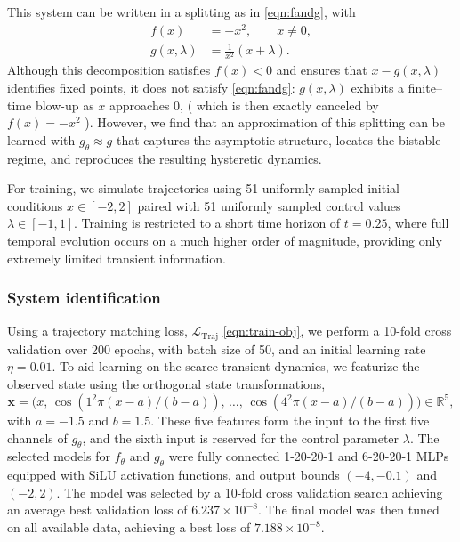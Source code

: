 \documentclass[11pt,twoside]{article}
\theoremstyle{plain}
\theoremstyle{definition}
\theoremstyle{remark}
\newcommand{\vect}[1]{\boldsymbol{#1}}
\begin{document}
This system can be written in a splitting as in \cref{eqn:fandg}, with
\begin{equation}
    \begin{split}
        f(x) &= -x^2, \qquad x \neq 0,\\
        g(x,\lambda) &= \frac{1}{x^2}(x+\lambda).
    \end{split}
    \label{eqn:f-g-decomp}
\end{equation}
Although this decomposition satisfies \(f(x) < 0\) and ensures that 
\(x - g(x,\lambda)\) identifies fixed points, it does not satisfy \cref{eqn:fandg}: 
\(g(x,\lambda)\) exhibits a finite–time blow-up as \(x\) approaches 0, ( which is then exactly canceled by \(f(x) = -x^2\) ). 
However, we find that an approximation of this splitting can be learned with \(g_\theta \approx g\) that captures the asymptotic structure, locates the bistable regime, and reproduces the resulting hysteretic dynamics.

For training, we simulate trajectories using 51 uniformly sampled initial conditions \(x \in [-2,2]\) paired with 51 uniformly sampled control values \(\lambda \in [-1,1]\). Training is restricted to a short time horizon of \(t=0.25\), where full temporal evolution occurs on a much higher order of magnitude, providing only extremely limited transient information. 


\subsubsection*{System identification}
Using a trajectory matching loss, \(\mathcal{L}_{\text{Traj}}\) \cref{eqn:train-obj}, we perform a 10-fold cross validation over 200 epochs, with batch size of 50, and an initial learning rate \(\eta = 0.01\). 
To aid learning on the scarce transient dynamics, we featurize the observed state using the orthogonal state transformations,
\begin{equation}
    \vect{x}
    = \bigl(x,\,
    \cos(1^2 \pi (x-a)/(b-a)),\,\ldots,\,
    \cos(4^2 \pi (x-a)/(b-a))\bigr)
    \in \mathbb{R}^5,
    \label{eqn:feat-x}
\end{equation}
with \(a=-1.5\) and \(b=1.5\). These five features form the input to the first five channels of \(g_\theta\), and the sixth input is reserved for the control parameter \(\lambda\). The selected models for \(f_\theta\) and \(g_\theta\) were fully connected 1-20-20-1 and 6-20-20-1 MLPs equipped with SiLU activation functions, and output bounds \((-4,-0.1)\) and \((-2,2)\). The model was selected by a 10-fold cross validation search achieving an average best validation loss of \(6.237 
\times 10^{-8}\). The final model was then tuned on all available data, achieving a best loss of \(7.188\times 10^{-8}\).
\end{document}
